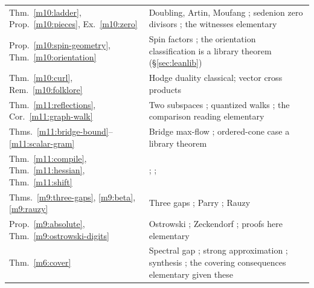 \documentclass[11pt,reqno]{amsart}
\theoremstyle{definition}
\theoremstyle{remark}
\numberwithin{equation}{section}
\begin{document}
\begin{center}
\begin{tabular}{@{}p{}p{}@{}}
Thm.~\ref{m10:ladder}, Prop.~\ref{m10:pieces}, Ex.~\ref{m10:zero} & Doubling, Artin, Moufang \cite{Baez02,Schafer66}; sedenion zero divisors \cite{m10:Moreno}; the witnesses elementary\\
Prop.~\ref{m10:spin-geometry}, Thm.~\ref{m10:orientation} & Spin factors \cite{m2:JNW,m10:HOS}; the orientation classification is a library theorem (\S\ref{sec:leanlib})\\
Thm.~\ref{m10:curl}, Rem.~\ref{m10:folklore} & Hodge duality classical; vector cross products \cite{m10:Eckmann,m10:BrownGray}\\
Thm.~\ref{m11:reflections}, Cor.~\ref{m11:graph-walk} & Two subspaces \cite{m11:Halmos}; quantized walks \cite{m11:Szegedy}; the comparison reading elementary\\
Thms.~\ref{m11:bridge-bound}--\ref{m11:scalar-gram} & Bridge max-flow \cite{m11:GLS,m11:Cui}; ordered-cone case a library theorem\\
Thm.~\ref{m11:compile}, Thm.~\ref{m11:hessian}, Thm.~\ref{m11:shift} & \cite{d4-dawson,m11:Selinger,m6:RS}; \cite{m11:BC,m11:Stokes}; \cite{m11:Schuld}\\
Thms.~\ref{m9:three-gaps}, \ref{m9:beta}, \ref{m9:rauzy} & Three gaps \cite{m9:Sos,m9:Swierczkowski,m9:Slater}; Parry \cite{m9:ParryBeta,m9:ParryMarkov}; Rauzy \cite{m9:Rauzy}\\
Prop.~\ref{m9:absolute}, Thm.~\ref{m9:ostrowski-digits} & Ostrowski \cite{m9:Ostrowski}; Zeckendorf \cite{m9:Zeckendorf}; proofs here elementary\\
Thm.~\ref{m6:cover} & Spectral gap \cite{m6:LPS,m6:PS}; strong approximation \cite{m6:Sardari}; synthesis \cite{m6:RS}; the covering consequences elementary given these\\
\bottomrule
\end{tabular}
\end{center}
\end{document}
